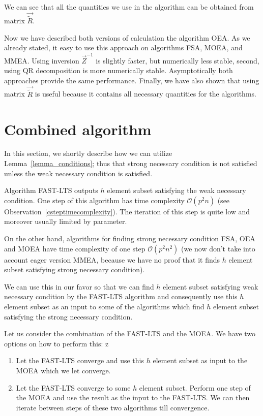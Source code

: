 \begin{remark} \label{qnotrequiredspeedupremark}
    We can see that all the quantities we use in the algorithm can be obtained from matrix $\vec{\tilde{R}}$.
\end{remark}

Now we have described both versions of calculation the algorithm OEA. As we already stated, it easy to use this approach on algorithms FSA, MOEA, and MMEA. Using inversion $\vec{Z}^{-1}$ is slightly faster, but numerically less stable, second, using QR decomposition is more numerically stable. Asymptotically both approaches provide the same performance. Finally, we have also shown that using matrix $\vec{\tilde{R}}$ is useful because it contains all necessary quantities for the algorithms.









\section{Combined algorithm} \label{sectioncombined}
In this section, we shortly describe how we can utilize Lemma~\ref{lemma_conditions}; thus that strong necessary condition is not satisfied unless the weak necessary condition is satisfied.

Algorithm FAST-LTS outputs $h$ element subset satisfying the weak necessary condition. One step of this algorithm has time complexity $\mathcal{O}(p^2n)$ (see Observation~\ref{csteptimecomplexity}). The iteration of this step is quite low and moreover usually limited by parameter. 

On the other hand, algorithms for finding strong necessary condition FSA, OEA and MOEA have time complexity of one step $\mathcal{O}(p^2n^2)$ (we now don't take into account eager version MMEA, because we have no proof that it finds $h$ element subset satisfying strong necessary condition). 

We can use this in our favor so that we can find $h$ element subset satisfying weak necessary condition by the FAST-LTS algorithm and consequently use this $h$ element subset as an input to some of the algorithms which find $h$ element subset satisfying the strong necessary condition.

Let us consider the combination of the FAST-LTS and the MOEA. We have two options on how to perform this:
z
\begin{enumerate}
    \item Let the FAST-LTS converge and use this $h$ element subset as input to the MOEA which we let converge.
    \item Let the FAST-LTS converge to some $h$ element subset. Perform one step of the MOEA and use the result as the input to the FAST-LTS. We can then iterate between steps of these two algorithms till convergence.
\end{enumerate}

